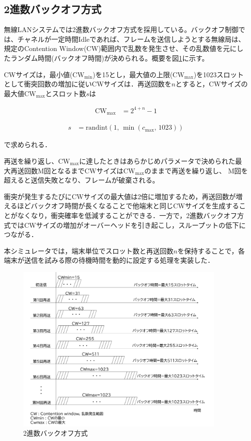 \documentclass[a4paper,10pt]{ltjsarticle}
\begin{document}
\clearpage
\subsection{2進数バックオフ方式}

無線LANシステムでは2進数バックオフ方式を採用している。バックオフ制御では、チャネルが一定時間Idleであれば、フレームを送信しようとする無線局は、規定のContention Window(CW)範囲内で乱数を発生させ、その乱数値を元にしたランダム時間(バックオフ時間)が決められる。概要を図\ref{binary-backoff}に示す。


CWサイズは，最小値($\mathrm{CW_{min}}$)を15とし，最大値の上限($\mathrm{CW_{max}}$)を1023スロットとして衝突回数の増加に従いCWサイズは．再送回数を$n$とすると，CWサイズの最大値$\mathrm{CW}_{\max}$とスロット数$s$は


\begin{align}
  \mathrm{CW}_{\max} &= 2^{4 + n} - 1
\end{align}

\begin{align}
  s &= \mathrm{randint}(1, \, \min(c_{\max}, \, 1023))
  \label{slot}
\end{align}

で求められる．

再送を繰り返し、$\mathrm{CW_{max}}$に達したときはあらかじめパラメータで決められた最大再送回数M回となるまでCWサイズは$\mathrm{CW_{max}}$のままで再送を繰り返し、
M回を超えると送信失敗となり、フレームが破棄される。

衝突が発生するたびにCWサイズの最大値は2倍に増加するため，再送回数が増えるほどバックオフ時間が長くなることで他端末と同じCWサイズを生成することがなくなり，衝突確率を低減することができる．一方で，2進数バックオフ方式ではCWサイズの増加がオーバーヘッドを引き起こし，スループットの低下につながる．


本シミュレータでは，端末単位でスロット数と再送回数$n$を保持することで，各端末が送信を試みる際の待機時間を動的に設定する処理を実装した．

\begin{figure}[H]
  \centering
  \includegraphics[width=0.93\textwidth]{./assets/CW_.png}
  \caption{2進数バックオフ方式}
  \label{binary-backoff}
\end{figure}
\end{document}
